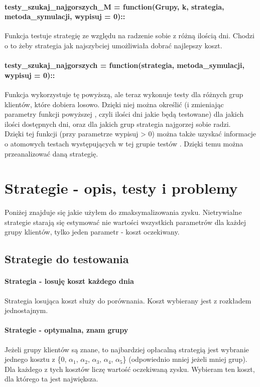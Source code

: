 \documentclass{article}
\begin{document}
\paragraph{testy\_szukaj\_najgorszych\_M = function(Grupy, k, strategia, metoda\_symulacji, wypisuj = 0)::} Funkcja testuje strategię
ze względu na radzenie sobie z różną ilością dni. Chodzi o to żeby strategia jak najszybciej umożliwiała dobrać
najlepszy koszt.
\paragraph{testy\_szukaj\_najgorszych = function(strategia, metoda\_symulacji, wypisuj = 0)::} Funkcja wykorzystuje tę powyższą, ale teraz
wykonuje testy dla różnych grup klientów, które dobiera losowo. Dzięki niej można określić (i zmieniając parametry funkcji powyższej
, czyli ilości dni jakie będą testowane) dla jakich ilości dostępnych dni, oraz dla jakich grup strategia najgorzej sobie radzi.
\\ Dzięki tej funkcji (przy parametrze wypisuj > 0) można także uzyskać informacje o atomowych testach występujących w tej grupie testów
. Dzięki temu można przeanalizować daną strategię.

\section{Strategie - opis, testy i problemy}
Poniżej znajduje się jakie użyłem do zmaksymalizowania zysku.
Nietrywialne strategie starają się estymować nie wartości wszystkich parametrów dla każdej grupy klientów, tylko 
jeden parametr - koszt oczekiwany.

\subsection{Strategie do testowania}
\paragraph{Strategia - losuję koszt każdego dnia}
Strategia losująca koszt służy do porównania. Koszt wybierany jest z rozkładem jednostajnym.
\paragraph{Strategie - optymalna, znam grupy}
Jeżeli grupy klientów są znane, to najbardziej opłacalną strategią jest wybranie jednego kosztu z \{0, $\alpha_1$, $\alpha_2$,
   $\alpha_3$, $\alpha_4$, $\alpha_5$\} (odpowiednio mniej jeżeli mniej grup). Dla każdego z tych kosztów liczę wartość oczekiwaną
   zysku. Wybieram ten koszt, dla którego ta jest największa.
\end{document}
